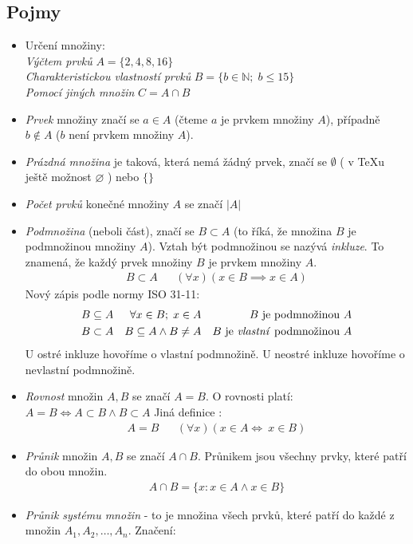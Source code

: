\documentclass[12pt]{article}
\begin{document}
\subsection{Pojmy}
\begin{itemize}
\item Určení množiny:\\  \emph{Výčtem prvků} $A = \{2,4,8,16\} ­$\\
\emph{Charakteristickou vlastností prvků} $B = \{b \in \mathbb{N}; \; b \leq15 \}$\\
\emph{Pomocí jiných množin} $C = A \cap B$
\item \emph{Prvek} množiny značí se $a \in A$ (čteme $a$ je prvkem množiny $A$), případně $b \notin A$ ($b$ není prvkem množiny $A$).
\item \emph{Prázdná množina} je taková, která nemá žádný prvek, značí se $\emptyset$ ( v \TeX u ještě možnost $\varnothing$ ) nebo $\{ \}$
\item \emph{Počet prvků} konečné množiny $A$ se značí $|A|$
\item \emph{Podmnožina} (neboli část), značí se $ B \subset A$ (to říká, že množina $B$ je podmnožinou množiny $A$).  Vztah být podmnožinou se nazývá \emph{inkluze}. To znamená, že každý prvek množiny $B$ je prvkem množiny $A$.
\begin{align}
B \subset A &&( \forall x) \left( x \in B  \implies x \in A \right)
\end{align}
Nový zápis podle normy ISO 31-11:
\begin{align}
B \subseteq A && \forall x \in B; \; x \in A && \text{$B$ je podmnožinou  $A$}\\
B \subset A && B \subseteq A \land B \neq A && \text{$B$ je \emph{vlastní} podmnožinou $A$}
\end{align}
U ostré inkluze hovoříme o vlastní podmnožině. U neostré inkluze hovoříme o nevlastní podmnožině.
\item \emph{Rovnost} množin $A,B$ se značí $A=B$. O rovnosti platí: $A = B \iff A \subset B \land B \subset A$ Jiná definice :
\begin{align}
A = B && (\forall x)(x \in A \iff \ x \in B)
\end{align}
\item \emph{Průnik} množin $A,B$ se značí $A \cap B$. Průnikem jsou všechny prvky, které patří do obou množin.
\begin{align}
A \cap B = \{ x: x \in A \land x \in B\}
\end{align}
\item \emph{Průnik systému množin} - to je množina všech prvků, které patří do každé z množin $A_1, A_2, \dotsc , A_n$. Značení:

\end{itemize}
\end{document}
